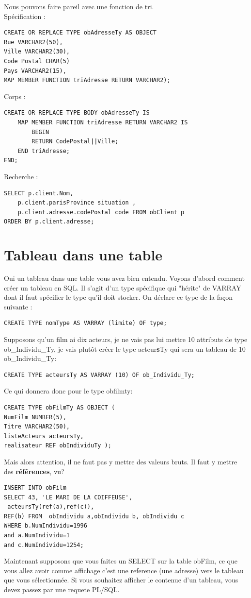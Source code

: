 \documentclass{report}
\begin{document}
Nous pouvons faire pareil avec une fonction de tri.\\
Spécification :
\begin{lstlisting}[style=MySQLStyle]
CREATE OR REPLACE TYPE obAdresseTy AS OBJECT
Rue VARCHAR2(50),
Ville VARCHAR2(30),
Code Postal CHAR(5)
Pays VARCHAR2(15),
MAP MEMBER FUNCTION triAdresse RETURN VARCHAR2);
\end{lstlisting}

Corps :
\begin{lstlisting}[style=MySQLStyle]
CREATE OR REPLACE TYPE BODY obAdresseTy IS
	MAP MEMBER FUNCTION triAdresse RETURN VARCHAR2 IS
		BEGIN
		RETURN CodePostal||Ville;
	END triAdresse;
END;
\end{lstlisting}

Recherche :
\begin{lstlisting}[style=MySQLStyle]
SELECT p.client.Nom,
	p.client.parisProvince situation ,
	p.client.adresse.codePostal code FROM obClient p
ORDER BY p.client.adresse;
\end{lstlisting}

\section{Tableau dans une table}
Oui un tableau dans une table vous avez bien entendu. Voyons d'abord comment créer un tableau en SQL. Il s'agit d'un type spécifique qui "hérite" de VARRAY dont il faut spécifier le type qu'il doit stocker. On déclare ce type de la façon suivante : \newline

\begin{lstlisting}[style=MySQLStyle]
CREATE TYPE nomType AS VARRAY (limite) OF type;
\end{lstlisting}
Supposons qu'un film ai dix acteurs, je ne vais pas lui mettre 10 attributs de type ob\_Individu\_Ty, je vais plutôt créer le type acteur\textbf{s}Ty qui sera un tableau de 10 ob\_Individu\_Ty:
\begin{lstlisting}[style=MySQLStyle]
CREATE TYPE acteursTy AS VARRAY (10) OF ob_Individu_Ty;
\end{lstlisting}
Ce qui donnera donc pour le type obfilmty:
\begin{lstlisting}[style=MySQLStyle]
CREATE TYPE obFilmTy AS OBJECT (
NumFilm NUMBER(5),
Titre VARCHAR2(50),
listeActeurs acteursTy,
realisateur REF obIndividuTy );
\end{lstlisting}
Mais alors attention, il ne faut pas y mettre des valeurs bruts. Il faut y mettre des \textbf{références}, vu? 
\begin{lstlisting}[style=MySQLStyle]
INSERT INTO obFilm
SELECT 43, 'LE MARI DE LA COIFFEUSE',
 acteursTy(ref(a),ref(c)),
REF(b) FROM  obIndividu a,obIndividu b, obIndividu c
WHERE b.NumIndividu=1996
and a.NumIndividu=1
and c.NumIndividu=1254;
\end{lstlisting}
Maintenant supposons que vous faites un SELECT sur la table obFilm, ce que vous allez avoir comme affichage c'est une reference (une adresse) vers le tableau que vous sélectionnée. Si vous souhaitez afficher le contenue d'un tableau, vous devez passez par une requete PL/SQL. 
\newpage
\end{document}
